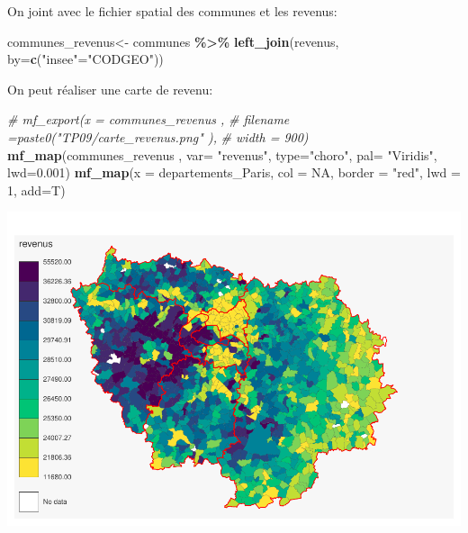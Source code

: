 \documentclass[
]{book}
\newenvironment{Shaded}{\begin{snugshade}}{\end{snugshade}}
\newcommand{\AttributeTok}[1]{\textcolor[rgb]{0.13,0.29,0.53}{#1}}
\newcommand{\CommentTok}[1]{\textcolor[rgb]{0.56,0.35,0.01}{\textit{#1}}}
\newcommand{\ConstantTok}[1]{\textcolor[rgb]{0.56,0.35,0.01}{#1}}
\newcommand{\DecValTok}[1]{\textcolor[rgb]{0.00,0.00,0.81}{#1}}
\newcommand{\FloatTok}[1]{\textcolor[rgb]{0.00,0.00,0.81}{#1}}
\newcommand{\FunctionTok}[1]{\textcolor[rgb]{0.13,0.29,0.53}{\textbf{#1}}}
\newcommand{\NormalTok}[1]{#1}
\newcommand{\OtherTok}[1]{\textcolor[rgb]{0.56,0.35,0.01}{#1}}
\newcommand{\SpecialCharTok}[1]{\textcolor[rgb]{0.81,0.36,0.00}{\textbf{#1}}}
\newcommand{\StringTok}[1]{\textcolor[rgb]{0.31,0.60,0.02}{#1}}
\begin{document}
On joint avec le fichier spatial des communes et les revenus:

\begin{Shaded}
\begin{Highlighting}[]
\NormalTok{communes\_revenus}\OtherTok{\textless{}{-}}\NormalTok{ communes }\SpecialCharTok{\%\textgreater{}\%}
  \FunctionTok{left\_join}\NormalTok{(revenus, }\AttributeTok{by=}\FunctionTok{c}\NormalTok{(}\StringTok{"insee"}\OtherTok{=}\StringTok{"CODGEO"}\NormalTok{))}
\end{Highlighting}
\end{Shaded}

On peut réaliser une carte de revenu:

\begin{Shaded}
\begin{Highlighting}[]
\CommentTok{\# mf\_export(x = communes\_revenus ,}
\CommentTok{\#           filename =paste0("TP09/carte\_revenus.png" ),}
\CommentTok{\#           width = 900)}
\FunctionTok{mf\_map}\NormalTok{(communes\_revenus ,}
       \AttributeTok{var=} \StringTok{"revenus"}\NormalTok{,}
       \AttributeTok{type=}\StringTok{"choro"}\NormalTok{,}
       \AttributeTok{pal=} \StringTok{"Viridis"}\NormalTok{,}
       \AttributeTok{lwd=}\FloatTok{0.001}\NormalTok{)}
\FunctionTok{mf\_map}\NormalTok{(}\AttributeTok{x =}\NormalTok{ departements\_Paris, }\AttributeTok{col =} \ConstantTok{NA}\NormalTok{, }\AttributeTok{border =} \StringTok{"red"}\NormalTok{, }\AttributeTok{lwd =} \DecValTok{1}\NormalTok{, }\AttributeTok{add=}\NormalTok{T)}
\end{Highlighting}
\end{Shaded}

\includegraphics{manuel_geo_quanti_files/figure-latex/unnamed-chunk-83-1.pdf}
\end{document}
